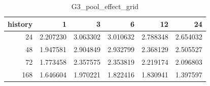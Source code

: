 \begin{table}
\caption{G3_pool_effect_grid}
\label{tab:G3_pool_effect_grid}
\begin{tabular}{rrrrrr}
\toprule
history & 1 & 3 & 6 & 12 & 24 \\
\midrule
24 & 2.207230 & 3.063302 & 3.010632 & 2.788348 & 2.654032 \\
48 & 1.947581 & 2.904849 & 2.932799 & 2.368129 & 2.505527 \\
72 & 1.773458 & 2.357575 & 2.353819 & 2.219174 & 2.096803 \\
168 & 1.646604 & 1.970221 & 1.822416 & 1.830941 & 1.397597 \\
\bottomrule
\end{tabular}
\end{table}
